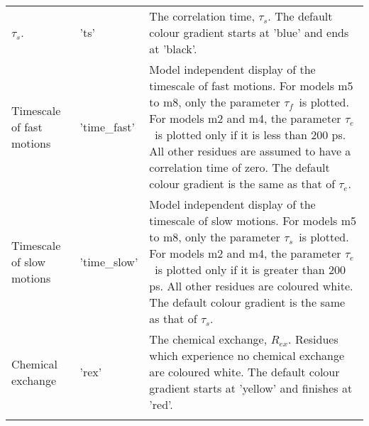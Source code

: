 \documentclass[a4paper,11pt,twoside,openright]{book}
\def\lthtmlcheckvsize{\ifdim\ht\sizebox<\vsize 
  \ifdim\wd\sizebox<\hsize\expandafter\hfill\fi \expandafter\vfill
  \else\expandafter\vss\fi}%
\begin{document}
{\begin{table*}
\begin{scriptsize}
\begin{center}
\begin{tabularx}{\textwidth}{llX}
$\tau_s$. & 'ts' & The correlation time, $\tau_s$.  The default colour gradient starts at 'blue' and ends at 'black'. \\
Timescale of fast motions & 'time\_fast' & Model independent display of the timescale of fast motions.  For models m5 to m8, only the parameter $\tau_f$\  is plotted.  For models m2 and m4, the parameter $\tau_e$\  is plotted only if it is less than 200 ps.  All other residues are assumed to have a correlation time of zero.  The default colour gradient is the same as that of $\tau_e$. \\
Timescale of slow motions & 'time\_slow' & Model independent display of the timescale of slow motions.  For models m5 to m8, only the parameter $\tau_s$\  is plotted.  For models m2 and m4, the parameter $\tau_e$\  is plotted only if it is greater than 200 ps.  All other residues are coloured white.  The default colour gradient is the same as that of $\tau_s$. \\
Chemical exchange & 'rex' & The chemical exchange, $R_{ex}$.  Residues which experience no chemical exchange are coloured white.  The default colour gradient starts at 'yellow' and finishes at 'red'. \\
\bottomrule
\\[-5pt]
\end{tabularx}
\end{center}
\end{scriptsize}
\end{table*}%
\lthtmlfigureZ
\lthtmlcheckvsize\clearpage}
\end{document}
